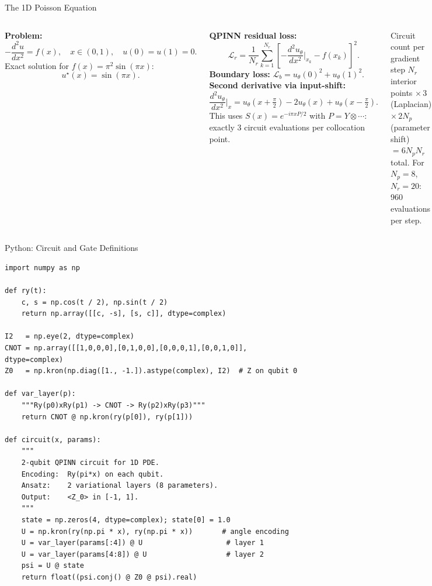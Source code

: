 \documentclass[aspectratio=169,11pt]{beamer}
\begin{document}
\begin{frame}{The 1D Poisson Equation}
  \begin{columns}[T]
    \textbf{Problem:}
    \[
      -\frac{d^2u}{dx^2} = f(x),\quad x\in(0,1),
      \quad u(0)=u(1)=0.
    \]
    Exact solution for $f(x)=\pi^2\sin(\pi x)$:
    \[
      u^\star(x) = \sin(\pi x).
    \]

    \textbf{QPINN residual loss:}
    \[
      \mathcal{L}_r
      = \frac{1}{N_r}\sum_{k=1}^{N_r}
        \left[-\frac{d^2u_\theta}{dx^2}\bigg|_{x_k}
              - f(x_k)\right]^2.
    \]
    \textbf{Boundary loss:}
    $\mathcal{L}_b = u_\theta(0)^2 + u_\theta(1)^2$.
    \textbf{Second derivative via input-shift:}
    \[
      \frac{d^2u_\theta}{dx^2}\bigg|_x
      = u_\theta(x{+}\tfrac\pi2)
        - 2u_\theta(x)
        + u_\theta(x{-}\tfrac\pi2).
    \]
    This uses $S(x)=e^{-i\pi xP/2}$ with $P=Y\otimes\cdots$:
    exactly 3 circuit evaluations per collocation point.
    \begin{alertblock}{Circuit count per gradient step}
      $N_r$ interior points $\times\,3$ (Laplacian)
      $\times\,2N_p$ (parameter shift)
      $= 6N_pN_r$ total.
      For $N_p=8$, $N_r=20$: 960 evaluations per step.
    \end{alertblock}
  \end{columns}
\end{frame}

\begin{frame}[fragile]{Python: Circuit and Gate Definitions}
\begin{lstlisting}[basicstyle=\tiny\ttfamily]
import numpy as np

def ry(t):
    c, s = np.cos(t / 2), np.sin(t / 2)
    return np.array([[c, -s], [s, c]], dtype=complex)

I2   = np.eye(2, dtype=complex)
CNOT = np.array([[1,0,0,0],[0,1,0,0],[0,0,0,1],[0,0,1,0]], dtype=complex)
Z0   = np.kron(np.diag([1., -1.]).astype(complex), I2)  # Z on qubit 0

def var_layer(p):
    """Ry(p0)xRy(p1) -> CNOT -> Ry(p2)xRy(p3)"""
    return CNOT @ np.kron(ry(p[0]), ry(p[1]))

def circuit(x, params):
    """
    2-qubit QPINN circuit for 1D PDE.
    Encoding:  Ry(pi*x) on each qubit.
    Ansatz:    2 variational layers (8 parameters).
    Output:    <Z_0> in [-1, 1].
    """
    state = np.zeros(4, dtype=complex); state[0] = 1.0
    U = np.kron(ry(np.pi * x), ry(np.pi * x))       # angle encoding
    U = var_layer(params[:4]) @ U                    # layer 1
    U = var_layer(params[4:8]) @ U                   # layer 2
    psi = U @ state
    return float((psi.conj() @ Z0 @ psi).real)
\end{lstlisting}
\end{frame}
\end{document}
